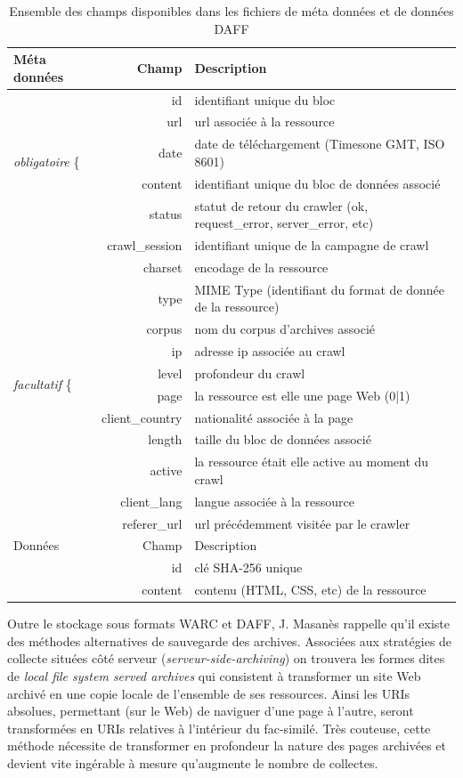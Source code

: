 \documentclass[symmetric,justified,marginals=raggedouter]{tufte-book}
\makeatletter
\newcommand{\vastt}{\bBigg@{4}}
\newcommand{\Vastt}{\bBigg@{11}}
\makeatother
\begin{document}
\begin{table}
  \label{tab:daff}
  \begin{tabular}{lrl}
    \toprule
    Méta données& Champ & Description\\
    \midrule  
    \multirow{5}{*}{\emph{obligatoire} \vastt\{ }&id&identifiant unique du bloc\\
    &url&url associée à la ressource\\
    &date&date de téléchargement (Timesone GMT, ISO 8601)\\
    &content&identifiant unique du bloc de données associé\\     
    &status&statut de retour du crawler (ok, request\_error, server\_error, etc)\\
    \midrule     
    \multirow{12}{*}{\emph{facultatif   } \Vastt\{ }&crawl\_session&identifiant unique de la campagne de crawl\\
    &charset&encodage de la ressource\\
    &type&MIME Type (identifiant du format de donnée de la ressource)\\
    &corpus&nom du corpus d'archives associé\\
    &ip&adresse ip associée au crawl\\
    &level&profondeur du crawl\\
    &page&la ressource est elle une page Web (0|1)\\
    &client\_country&nationalité associée à la page\\
    &length&taille du bloc de données associé\\
	&active&la ressource était elle active au moment du crawl\\
	&client\_lang&langue associée à la ressource\\
	&referer\_url&url précédemment visitée par le crawler\\
    \midrule
    Données& Champ & Description\\
    \midrule 
    &id&clé SHA-256 unique\\
    &content&contenu (HTML, CSS, etc) de la ressource\\    	
    \bottomrule
\end{tabular}
  \bigskip
  \caption{Ensemble des champs disponibles dans les fichiers de méta données et de données DAFF}
\end{table} 

\noindent Outre le stockage sous formats WARC et DAFF, J. Masanès \citep{masanes_web_2006} rappelle qu'il existe des méthodes alternatives de sauvegarde des archives. Associées aux stratégies de collecte situées côté serveur (\textit{serveur-side-archiving}) on trouvera les formes dites de \textit{local file system served archives} qui consistent à transformer un site Web archivé en une copie locale de l'ensemble de ses ressources. Ainsi les URIs absolues, permettant (sur le Web) de naviguer d'une page à l'autre, seront transformées en URIs relatives à l'intérieur du fac-similé. Très couteuse, cette méthode nécessite de transformer en profondeur la nature des pages archivées et devient vite ingérable à mesure qu'augmente le nombre de collectes.
\end{document}
